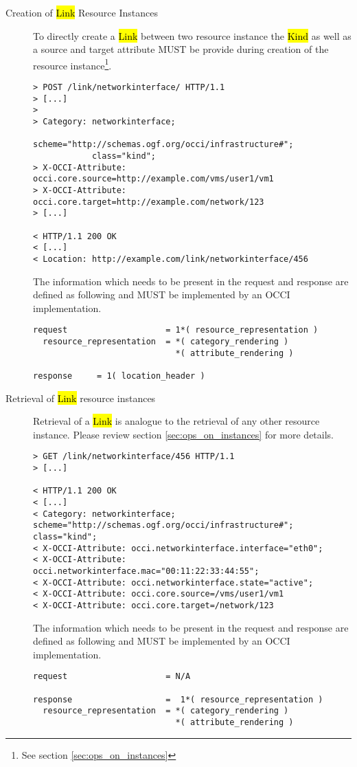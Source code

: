 \documentclass[10pt,a4paper]{article}
\begin{document}
\begin{description}
  \item[Creation of \hl{Link} Resource Instances] To directly create a
    \hl{Link} between two resource instance the \hl{Kind} as well as a
    source and target attribute MUST be provide during creation of the
    resource instance\footnote{See section \ref{sec:ops_on_instances}}.

\begin{verbatim}
> POST /link/networkinterface/ HTTP/1.1
> [...]
> 
> Category: networkinterface; 
            scheme="http://schemas.ogf.org/occi/infrastructure#"; 
            class="kind"; 
> X-OCCI-Attribute: occi.core.source=http://example.com/vms/user1/vm1
> X-OCCI-Attribute: occi.core.target=http://example.com/network/123
> [...]
 
< HTTP/1.1 200 OK
< [...]
< Location: http://example.com/link/networkinterface/456
\end{verbatim}

    The information which needs to be present in the request and
    response are defined as following and MUST be implemented by an
    OCCI implementation.

\begin{verbatim}
request                    = 1*( resource_representation )
  resource_representation  = *( category_rendering )
                             *( attribute_rendering )

response     = 1( location_header )
\end{verbatim}

  \item[Retrieval of \hl{Link} resource instances] Retrieval of a
    \hl{Link} is analogue to the retrieval of any other resource
    instance. Please review section \ref{sec:ops_on_instances} for
    more details.

\begin{verbatim}
> GET /link/networkinterface/456 HTTP/1.1
> [...]

< HTTP/1.1 200 OK
< [...]
< Category: networkinterface; scheme="http://schemas.ogf.org/occi/infrastructure#"; class="kind";
< X-OCCI-Attribute: occi.networkinterface.interface="eth0";
< X-OCCI-Attribute: occi.networkinterface.mac="00:11:22:33:44:55";
< X-OCCI-Attribute: occi.networkinterface.state="active";
< X-OCCI-Attribute: occi.core.source=/vms/user1/vm1
< X-OCCI-Attribute: occi.core.target=/network/123
\end{verbatim}

    The information which needs to be present in the request and
    response are defined as following and MUST be implemented by an
    OCCI implementation.

\begin{verbatim}
request                    = N/A

response                   =  1*( resource_representation )
  resource_representation  = *( category_rendering )
                             *( attribute_rendering )
\end{verbatim}

\end{description}
\end{document}
